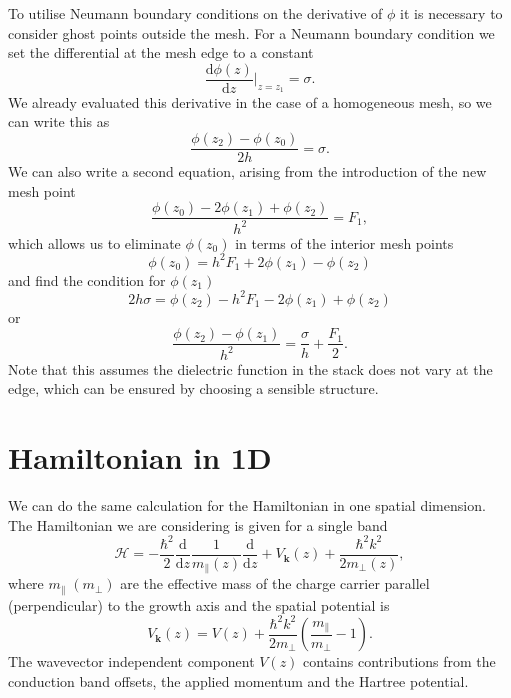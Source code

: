 \documentclass[reprint, amsmath,amssymb, aps]{revtex4-1}
\begin{document}
To utilise Neumann boundary conditions on the derivative of $\phi$ it is necessary to consider ghost points outside the mesh. For a Neumann boundary condition we set the differential at the mesh edge to a constant
\begin{equation}
	\frac{\mathrm{d} \phi \left(z\right)}{\mathrm{d} z} \biggr\vert_{z = z_1} = \sigma.
\end{equation}
We already evaluated this derivative in the case of a homogeneous mesh, so we can write this as
\begin{equation}
	\frac{\phi\left(z_{2}\right) - \phi\left(z_{0}\right)}{2 h} = \sigma.
\end{equation}
We can also write a second equation, arising from the introduction of the new mesh point
\begin{equation}
	\frac{\phi\left(z_0\right) - 2 \phi \left(z_1\right) + \phi \left(z_2\right)}{h^2} = F_1,
\end{equation}
which allows us to eliminate $\phi\left(z_0\right)$ in terms of the interior mesh points
\begin{equation}
	\phi\left(z_0\right) = h^2 F_1 + 2 \phi\left(z_1\right) - \phi\left(z_2\right)
\end{equation}
and find the condition for $\phi\left(z_1\right)$
\begin{equation}
	2 h \sigma = \phi\left(z_2\right) - h^2 F_1 - 2 \phi\left(z_1\right) + \phi\left(z_2\right)
\end{equation}
or
\begin{equation}
	\frac{\phi\left(z_2\right) - \phi\left(z_1\right)}{h^2} = \frac{\sigma}{h} + \frac{F_1}{2}.
\end{equation}
Note that this assumes the dielectric function in the stack does not vary at the edge, which can be ensured by choosing a sensible structure.

\section{Hamiltonian in 1D}
We can do the same calculation for the Hamiltonian in one spatial dimension. The Hamiltonian we are considering is given for a single band
\begin{equation}
	\hat{\mathcal{H}} = - \frac{\hbar^2}{2} \frac{\mathrm{d}}{\mathrm{d} z} \frac{1}{m_{\parallel} \left(z\right)} \frac{\mathrm{d}}{\mathrm{d} z} + V_{\mathbf{k}} \left(z\right)+ \frac{\hbar^2 k^2}{2 m_{\perp}\left(z\right)},
\end{equation}
where $m_{\parallel} \; (m_{\perp})$ are the effective mass of the charge carrier parallel (perpendicular) to the growth axis and the spatial potential is
\begin{equation}
	V_{\mathbf{k}} \left(z\right) = V\left(z\right) + \frac{\hbar^2 k^2}{2 m_{\perp}} \left(\frac{m_{\parallel}}{m_{\perp}} - 1\right).
\end{equation}
The wavevector independent component $V\left(z\right)$ contains contributions from the conduction band offsets, the applied momentum and the Hartree potential.
\end{document}
